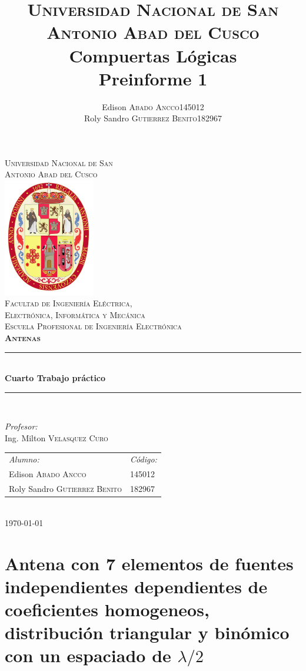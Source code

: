 \documentclass[11pt]{book}
\title{
	\textsc{Universidad Nacional de San Antonio Abad del Cusco}\\
	\textbf{Compuertas Lógicas}\\
	Preinforme 1}
\author{
	\begin{tabular}{lr}
		Edison \textsc{Abado Ancco} & 145012 \\
		Roly Sandro \textsc{Gutierrez Benito} & 182967\\
	\end{tabular}
}
\begin{document}
	
\begin{titlepage}
	\newcommand{\HRule}{\rule{\linewidth}{0.5mm}} 
	\center
	\textsc{\LARGE  Universidad Nacional de San \\[0.2cm] Antonio Abad del Cusco}\\[1.5cm] 
	\includegraphics[width=4cm]{IMAGENES/escudo}\\[1cm]
	\textsc{\Large Facultad de Ingeniería Eléctrica, \\ Electrónica, Informática y Mecánica}\\[0.5cm] 
	\textsc{\large Escuela Profesional de Ingeniería Electrónica}\\[0.5cm]
	\textsc{\Large \textbf{Antenas}}\\[0.5cm] 
	\HRule \\[0.4cm]
	{ \huge \bfseries Cuarto Trabajo práctico}\\[0.4cm] 
	\HRule \\[1.5cm]
	\begin{minipage}{\textwidth}
		\center 
		
		\emph{Profesor:} \\
		Ing. Milton \textsc{Velasquez Curo} \\[1cm]
		
		\begin{tabular}{ll}
			\emph{Alumno:} & \emph{Código:}\\
			Edison \textsc{Abado Ancco} & 145012 \\
			Roly Sandro \textsc{Gutierrez Benito} & 182967\\
		\end{tabular}
	\end{minipage}\\[2cm]
	\today
\end{titlepage}


\newpage


\chapter{Antena con 7 elementos de fuentes independientes dependientes de coeficientes homogeneos, distribución triangular y binómico con un espaciado de $\lambda/2$}
\end{document}
